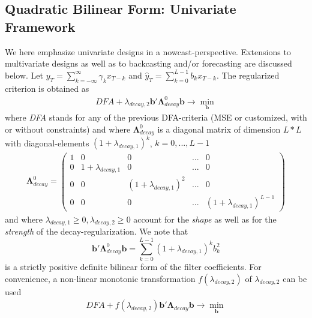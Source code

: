 \documentclass[a4paper]{book}
\begin{document}
\subsection{Quadratic Bilinear Form: Univariate Framework}


We here emphasize univariate designs in a {nowcast}-perspective. Extensions to multivariate designs as well as to backcasting and/or forecasting are discussed below.
Let $y_T=\sum_{k=-\infty}^{\infty}\gamma_kx_{T-k}$ and $\hat{y}_T=\sum_{k=0}^{L-1}b_kx_{T-k}$. The regularized criterion is obtained as 
\begin{eqnarray*}
DFA+\lambda_{decay,2}\mathbf{b}'\boldsymbol{\Lambda}_{decay}^0\mathbf{b}\to \min_{\mathbf{b}}
\end{eqnarray*}
where \emph{DFA} stands for any of the previous DFA-criteria (MSE or customized, with or without constraints) and where $\boldsymbol{\Lambda}_{decay}^0$ is a diagonal matrix of dimension $L*L$ with diagonal-elements $(1+\lambda_{decay,1})^k$, $k=0,...,L-1$
\begin{eqnarray*}
\boldsymbol{\Lambda}_{decay}^0=\left(\begin{array}{ccccc}1&0&0&...&0\\
                                              0&1+\lambda_{decay,1}&0&...&0\\
                                              0&0&(1+\lambda_{decay,1})^2&...&0\\
                                              0&0&0&...&(1+\lambda_{decay,1})^{L-1}                                              
                                              \end{array}\right)
\end{eqnarray*}
and where $\lambda_{decay,1}\geq 0,\lambda_{decay,2}\geq 0$ account for the \emph{shape} as well as for the \emph{strength} of the decay-regularization. We note that
\[\mathbf{b}'\boldsymbol{\Lambda}_{decay}^0\mathbf{b}=\sum_{k=0}^{L-1}(1+\lambda_{decay,1})^{k}b_k^2\]
is a strictly positive definite bilinear form of the filter coefficients. For convenience, a non-linear monotonic transformation $f(\lambda_{decay,2})$ of $\lambda_{decay,2}$ can be used 
\begin{eqnarray}\label{decay_term}
DFA+f(\lambda_{decay,2})\mathbf{b}'\boldsymbol{\Lambda}_{decay}\mathbf{b}\to \min_{\mathbf{b}}
\end{eqnarray}
\end{document}
